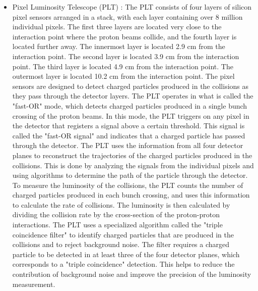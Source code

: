 \begin{itemize}
\item Pixel Luminosity Telescope (PLT) : The PLT consists of four layers of silicon pixel sensors arranged in a stack, with each layer containing over 8 million individual pixels. The first three layers are located very close to the interaction point where the proton beams collide, and the fourth layer is located further away. The innermost layer is located 2.9 cm from the interaction point. The second layer is located 3.9 cm from the interaction point. The third layer is located 4.9 cm from the interaction point. The outermost layer is located 10.2 cm from the interaction point. The pixel sensors are designed to detect charged particles produced in the collisions as they pass through the detector layers. The PLT operates in what is called the "fast-OR" mode, which detects charged particles produced in a single bunch crossing of the proton beams. In this mode, the PLT triggers on any pixel in the detector that registers a signal above a certain threshold. This signal is called the "fast-OR signal" and indicates that a charged particle has passed through the detector. The PLT uses the information from all four detector planes to reconstruct the trajectories of the charged particles produced in the collisions. This is done by analyzing the signals from the individual pixels and using algorithms to determine the path of the particle through the detector. To measure the luminosity of the collisions, the PLT counts the number of charged particles produced in each bunch crossing, and uses this information to calculate the rate of collisions. The luminosity is then calculated by dividing the collision rate by the cross-section of the proton-proton interactions. The PLT uses a specialized algorithm called the "triple coincidence filter" to identify charged particles that are produced in the collisions and to reject background noise. The filter requires a charged particle to be detected in at least three of the four detector planes, which corresponds to a "triple coincidence" detection. This helps to reduce the contribution of background noise and improve the precision of the luminosity measurement.


\end{itemize}
